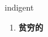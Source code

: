 
\begin{frame}
{\huge indigent}
\begin{center}
\begin{enumerate}\Large
  \item \textbf{贫穷的}
\end{enumerate}
\end{center}
\end{frame}
